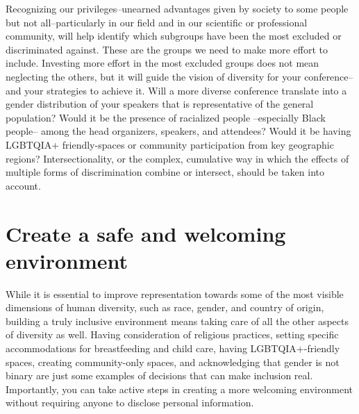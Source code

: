 \documentclass[10pt,letterpaper]{article}
\begin{document}
Recognizing our privileges--unearned advantages given by society to some people but not all--particularly in our field and in our scientific or professional community, will help identify which subgroups have been the most excluded or discriminated against. 
These are the groups we need to make more effort to include. 
Investing more effort in the most excluded groups does not mean neglecting the others, but it will guide the vision of diversity for your conference--and your strategies to achieve it.
Will a more diverse conference translate into a gender distribution of your speakers that is representative of the general population? 
Would it be the presence of racialized people --especially Black people-- among the head organizers, speakers, and attendees? 
Would it be having LGBTQIA+ friendly-spaces or community participation from key geographic regions?
Intersectionality, or the complex, cumulative way in which the effects of multiple forms of discrimination combine or intersect, should be taken into account. 




\section{Create a safe and welcoming environment}
\label{rule_inclusion}

While it is essential to improve representation towards some of the most visible dimensions of human diversity, such as race, gender, and country of origin, building a truly inclusive environment means taking care of all the other aspects of diversity as well. 
Having consideration of religious practices, setting specific accommodations for breastfeeding and child care, having LGBTQIA+-friendly spaces, creating community-only spaces, and acknowledging that gender is not binary are just some examples of decisions that can make inclusion real.
Importantly, you can take active steps in creating a more welcoming environment without requiring anyone to disclose personal information.
\end{document}
